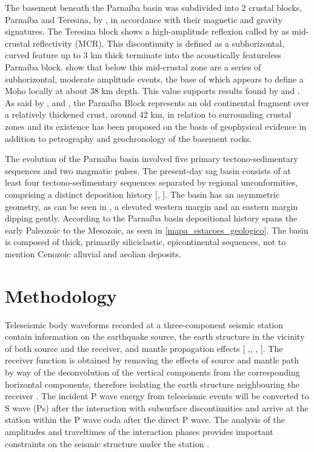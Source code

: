 \documentclass[paper,11pt]{geophysics}
\begin{document}
The basement beneath the Parnaíba basin was subdivided into 2 crustal blocks, Parnaíba and Teresina, by \cite{de_castro_geophysical_2016}, in accordance with their magnetic and gravity signatures. The Teresina block shows a high-amplitude reflexion called by \cite{daly_brasiliano_2014} as mid-crustal reflectivity (MCR). This discontinuity is defined as a subhorizontal, curved feature up to 3 km thick terminate into the acoustically featureless Parnaíba block. \cite{daly_brasiliano_2014} show that below this mid-crustal zone are a series of subhorizontal, moderate amplitude events, the base of which appears to define a Moho locally at about 38 km depth. This value supports results found by \cite{de_castro_crustal_2014} and \cite{de_castro_geophysical_2016}. As said by \cite{fuck_rodinia_2008}, \cite{de_castro_crustal_2014} and \cite{de_castro_geophysical_2016}, the Parnaíba Block represents an old continental fragment over a relatively thickened crust, around 42 km, in relation to surrounding crustal zones and its existence has been proposed on the basis of geophysical evidence in addition to petrography and geochronology of the basement rocks. 

The evolution of the Parnaíba basin involved five primary tectono-sedimentary sequences and two magmatic pulses. The present-day sag basin consists of at least four tectono-sedimentary sequences separated by regional unconformities, comprising a distinct deposition history [\cite{goes_feijo_1994}, \cite{vaz_bacia_2007}]. The basin has an asymmetric geometry, as can be seen in \cite{daly_brasiliano_2014}, a elevated western margin and an eastern margin dipping gently. According to \cite{goes_feijo_1994} the Parnaíba basin depositional history spans the early Paleozoic to the Mesozoic, as seen in \ref{mapa_estacoes_geologico}. The basin is composed of thick, primarily siliciclastic, epicontinental sequences, not to mention Cenozoic alluvial and aeolian deposits.

\section{Methodology}

Teleseismic body waveforms recorded at a three-component seismic station contain information on the earthquake source, the earth structure in the vicinity of both source and the receiver, and mantle propagation effects [\cite{langston_structure_1979} ,\cite{ammon_isolation_1991}, \cite{cassidy_numerical_1992}, \cite{ligorria_iterative_1999}]. The receiver function is obtained by removing the effects of source and mantle path by way of the deconvolution of the vertical components from the corresponding horizontal components, therefore isolating the earth structure neighbouring the receiver \citep{ligorria_iterative_1999}. The incident P wave energy from teleseismic events will be converted to S wave (Ps) after the interaction with subsurface discontinuities and arrive at the station within the P wave coda after the direct P wave. The analysis of the amplitudes and traveltimes of the interaction phases provides important constraints on the seismic structure under the station \citep{zhu_moho_2000}.
\end{document}
